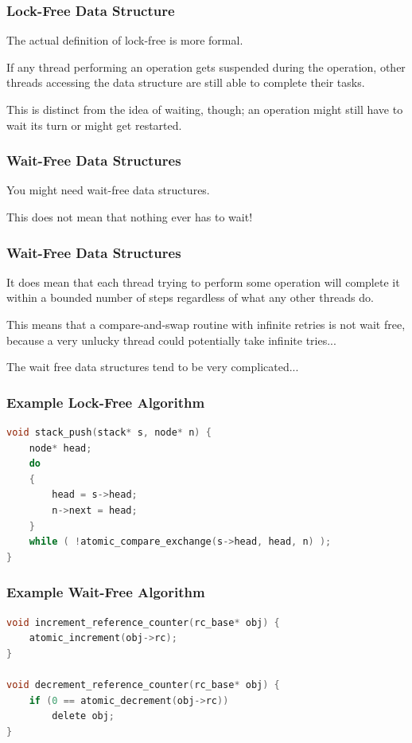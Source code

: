 \begin{frame}
\frametitle{Lock-Free Data Structure}

The actual definition of lock-free is more formal. 

If any thread performing an operation gets suspended during the operation, other threads accessing the data structure are still able to complete their tasks.

This is distinct from the idea of waiting, though; an operation might still have to wait its turn or might get restarted.

\end{frame}



\begin{frame}
\frametitle{Wait-Free Data Structures}

You might need wait-free data structures. 

This does not mean that nothing ever has to wait! 

\end{frame}



\begin{frame}
\frametitle{Wait-Free Data Structures}


It does mean that each thread trying to perform some operation will complete it within a bounded number of steps regardless of what any other threads do. 

This means that a compare-and-swap routine with infinite retries is not wait free, because a very unlucky thread could potentially take infinite tries...

The wait free data structures tend to be very complicated...

\end{frame}


\begin{frame}[fragile]
\frametitle{Example Lock-Free Algorithm}

\begin{lstlisting}[language=C]
void stack_push(stack* s, node* n) {
    node* head;
    do
    {
        head = s->head;
        n->next = head;
    }
    while ( !atomic_compare_exchange(s->head, head, n) );
} 
\end{lstlisting}

\end{frame}

\begin{frame}[fragile]
\frametitle{Example Wait-Free Algorithm}

\begin{lstlisting}[language=C]
void increment_reference_counter(rc_base* obj) {
    atomic_increment(obj->rc);
}

void decrement_reference_counter(rc_base* obj) {
    if (0 == atomic_decrement(obj->rc))
        delete obj;
} 
\end{lstlisting}

\end{frame}


